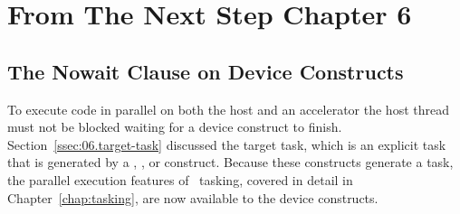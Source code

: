 \section{From The Next Step Chapter 6}

\subsection{The Nowait Clause on Device Constructs}
\label{sec:06.async-exec}


To execute code in parallel on both the host and an
accelerator the host thread must not be blocked waiting for a
device construct to finish.  Section~\ref{ssec:06.target-task} discussed the
target task, which is an explicit task that is generated by a ,
,  or 
construct.  Because these constructs generate a task, the parallel execution
features of \OMP\ tasking, covered in detail in Chapter~\ref{chap:tasking}, are
now available to the device constructs.

